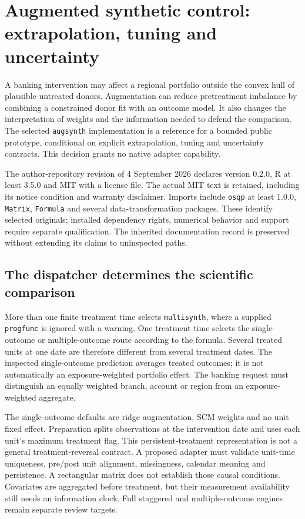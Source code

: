 \section{Augmented synthetic control: extrapolation, tuning and uncertainty}
\label{sec:exec24-augsynth-reuse}

A banking intervention may affect a regional portfolio outside the convex
hull of plausible untreated donors. Augmentation can reduce pretreatment
imbalance by combining a constrained donor fit with an outcome model. It
also changes the interpretation of weights and the information needed to
defend the comparison. The selected \texttt{augsynth} implementation is a
reference for a bounded public prototype, conditional on explicit
extrapolation, tuning and uncertainty contracts. This decision grants no
native adapter capability.~\citep{exec24_augsynth_choice}

The author-repository revision of 4 September 2026 declares version 0.2.0,
R at least 3.5.0 and MIT with a license file. The actual MIT text is retained,
including its notice condition and warranty disclaimer. Imports include
\texttt{osqp} at least 1.0.0, \texttt{Matrix}, \texttt{Formula} and several
data-transformation packages. These identify selected originals; installed
dependency rights, numerical behavior and support require separate
qualification. The inherited documentation record is preserved without
extending its claims to uninspected paths.
\citep{exec24_augsynth_source,v12_sw_augsynth}

\subsection{The dispatcher determines the scientific comparison}
More than one finite treatment time selects \texttt{multisynth}, where a
supplied \texttt{progfunc} is ignored with a warning. One treatment time
selects the single-outcome or multiple-outcome route according to the
formula. Several treated units at one date are therefore different from
several treatment dates. The inspected single-outcome prediction averages
treated outcomes; it is not automatically an exposure-weighted portfolio
effect. The banking request must distinguish an equally weighted branch,
account or region from an exposure-weighted aggregate.
\citep{exec24_augsynth_source}

The single-outcome defaults are ridge augmentation, SCM weights and no unit
fixed effect. Preparation splits observations at the intervention date and
uses each unit's maximum treatment flag. This persistent-treatment
representation is not a general treatment-reversal contract. A proposed
adapter must validate unit-time uniqueness, pre/post unit alignment,
missingness, calendar meaning and persistence. A rectangular matrix does
not establish those causal conditions. Covariates are aggregated before
treatment, but their measurement availability still needs an information
clock. Full staggered and multiple-outcome engines remain separate review
targets.~\citep{exec24_augsynth_source,exec24_augsynth_choice}

